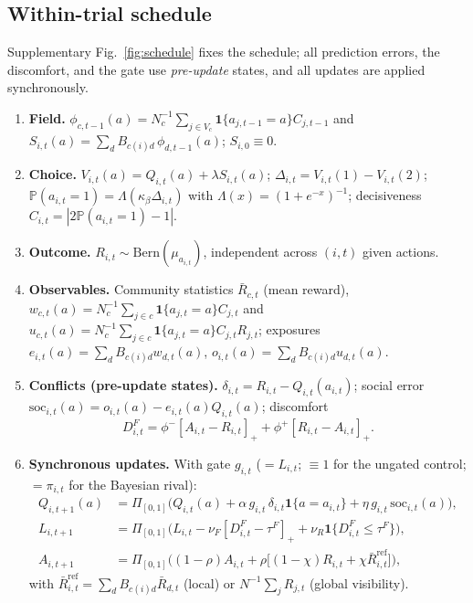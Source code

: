 \documentclass[11pt]{article}
\newcommand{\Prob}{\mathbb{P}}
\newcommand{\1}{\mathbf{1}}
\begin{document}
\subsection{Within-trial schedule}
Supplementary Fig.~\ref{fig:schedule} fixes the schedule; all prediction errors, the discomfort, and the gate use \emph{pre-update} states, and all updates are applied synchronously.

\begin{enumerate}[leftmargin=1.8em,itemsep=0pt]
\item \textbf{Field.} $\phi_{c,t-1}(a)=N_c^{-1}\sum_{j\in V_c}\1\{a_{j,t-1}=a\}C_{j,t-1}$ and $S_{i,t}(a)=\sum_d B_{c(i)d}\,\phi_{d,t-1}(a)$; $S_{i,0}\equiv0$.
\item \textbf{Choice.} $V_{i,t}(a)=Q_{i,t}(a)+\lambda S_{i,t}(a)$; $\Delta_{i,t}=V_{i,t}(1)-V_{i,t}(2)$; $\Prob(a_{i,t}{=}1)=\Lambda(\kappa_\beta\Delta_{i,t})$ with $\Lambda(x)=(1+e^{-x})^{-1}$; decisiveness $C_{i,t}=|2\Prob(a_{i,t}{=}1)-1|$.
\item \textbf{Outcome.} $R_{i,t}\sim\mathrm{Bern}(\mu_{a_{i,t}})$, independent across $(i,t)$ given actions.
\item \textbf{Observables.} Community statistics $\bar R_{c,t}$ (mean reward), $w_{c,t}(a)=N_c^{-1}\sum_{j\in c}\1\{a_{j,t}=a\}C_{j,t}$ and $u_{c,t}(a)=N_c^{-1}\sum_{j\in c}\1\{a_{j,t}=a\}C_{j,t}R_{j,t}$; exposures $e_{i,t}(a)=\sum_d B_{c(i)d}w_{d,t}(a)$, $o_{i,t}(a)=\sum_d B_{c(i)d}u_{d,t}(a)$.
\item \textbf{Conflicts (pre-update states).} $\delta_{i,t}=R_{i,t}-Q_{i,t}(a_{i,t})$; social error $\mathrm{soc}_{i,t}(a)=o_{i,t}(a)-e_{i,t}(a)Q_{i,t}(a)$; discomfort
\begin{equation}
D^F_{i,t}=\phi^-[A_{i,t}-R_{i,t}]_+ +\phi^+[R_{i,t}-A_{i,t}]_+ .
\label{eq:DF}
\end{equation}
\item \textbf{Synchronous updates.} With gate $g_{i,t}$ ($=L_{i,t}$; $\equiv1$ for the ungated control; $=\pi_{i,t}$ for the Bayesian rival):
\begin{align}
Q_{i,t+1}(a) &= \Pi_{[0,1]}\Big(Q_{i,t}(a)+\alpha\,g_{i,t}\,\delta_{i,t}\1\{a=a_{i,t}\}+\eta\,g_{i,t}\,\mathrm{soc}_{i,t}(a)\Big),\label{eq:Qfull}\\
L_{i,t+1} &= \Pi_{[0,1]}\Big(L_{i,t}-\nu_F[D^F_{i,t}-\tau^F]_+ +\nu_R\1\{D^F_{i,t}\le\tau^F\}\Big),\label{eq:Lfull}\\
A_{i,t+1} &= \Pi_{[0,1]}\Big((1-\rho)A_{i,t}+\rho\big[(1-\chi)R_{i,t}+\chi\bar R^{\mathrm{ref}}_{i,t}\big]\Big),\label{eq:Afull}
\end{align}
with $\bar R^{\mathrm{ref}}_{i,t}=\sum_d B_{c(i)d}\bar R_{d,t}$ (local) or $N^{-1}\sum_j R_{j,t}$ (global visibility).
\end{enumerate}
\end{document}
